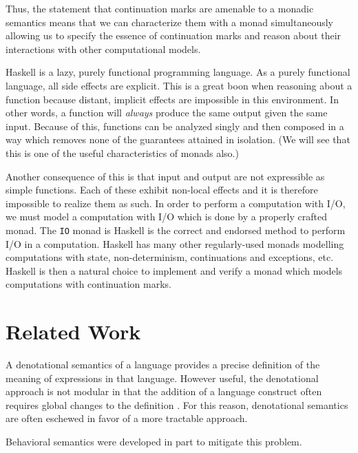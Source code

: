 \documentclass[ms]{byuprop}
\begin{document}
Thus, the statement that continuation marks are amenable to a monadic semantics means that we can characterize them with a monad simultaneously allowing us to specify the essence of continuation marks and reason about their interactions with other computational models.

Haskell \cite{hudak1992report} is a lazy, purely functional programming language. As a purely functional language, all side effects are explicit. This is a great boon when reasoning about a function because distant, implicit effects are impossible in this environment. In 
other words, a function will \emph{always} produce the same output given the same input.
Because of this, functions can be analyzed singly and then composed in a way which removes none of the guarantees attained in isolation. (We will see that this is one of the useful characteristics of monads also.)

Another consequence of this is that input and output are not expressible as simple functions. Each of these exhibit non-local effects and it is therefore impossible to realize them as such. In order to perform a computation with I/O, we must model a computation with I/O which is done by a properly crafted monad. The \texttt{IO} monad is Haskell is the correct and endorsed method to perform I/O in a computation. Haskell has many other regularly-used monads modelling computations with state, non-determinism, continuations and exceptions, etc. Haskell is then a natural choice to implement and verify a monad which models computations with continuation marks.

\section{Related Work}

A denotational semantics of a language provides a precise definition of the meaning of expressions in that language. However useful, the denotational approach is not modular in that the addition of a language construct often requires global changes to the definition \cite{liang2009modular}. For this reason, denotational semantics are often eschewed in favor of a more tractable approach.

Behavioral semantics were developed in part to mitigate this problem.
\end{document}
